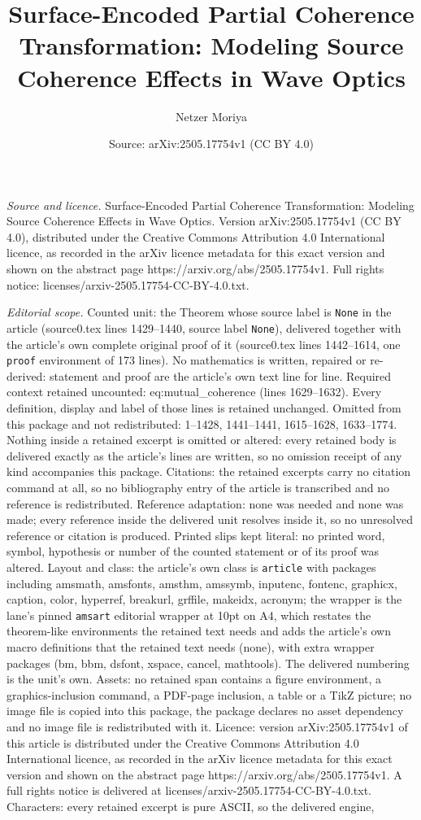 \documentclass[10pt,a4paper]{amsart}
\title[Surface-Encoded Partial Coherence Transformation: Modeling S]{Surface-Encoded Partial Coherence Transformation: Modeling Source Coherence Effects in Wave Optics}
\author{Netzer Moriya}
\date{Source: arXiv:2505.17754v1 (CC BY 4.0)}
\begin{document}
\maketitle

\noindent\emph{Source and licence.} Surface-Encoded Partial Coherence Transformation: Modeling Source Coherence Effects in Wave Optics. Version arXiv:2505.17754v1 (CC BY 4.0), distributed under the Creative Commons Attribution 4.0 International licence, as recorded in the arXiv licence metadata for this exact version and shown on the abstract page https://arxiv.org/abs/2505.17754v1. Full rights notice: licenses/arxiv-2505.17754-CC-BY-4.0.txt.\par\smallskip

\noindent\textit{Editorial scope.} Counted unit: the Theorem whose source label is \texttt{None} in the article (source0.tex lines 1429--1440, source label \texttt{None}), delivered together with the article's own complete original proof of it (source0.tex lines 1442--1614, one \texttt{proof} environment of 173 lines). No mathematics is written, repaired or re-derived: statement and proof are the article's own text line for line. Required context retained uncounted: eq:mutual\_coherence (lines 1629--1632). Every definition, display and label of those lines is retained unchanged. Omitted from this package and not redistributed: 1--1428, 1441--1441, 1615--1628, 1633--1774. Nothing inside a retained excerpt is omitted or altered: every retained body is delivered exactly as the article's lines are written, so no omission receipt of any kind accompanies this package. Citations: the retained excerpts carry no citation command at all, so no bibliography entry of the article is transcribed and no reference is redistributed. Reference adaptation: none was needed and none was made; every reference inside the delivered unit resolves inside it, so no unresolved reference or citation is produced. Printed slips kept literal: no printed word, symbol, hypothesis or number of the counted statement or of its proof was altered. Layout and class: the article's own class is \texttt{article} with packages including amsmath, amsfonts, amsthm, amssymb, inputenc, fontenc, graphicx, caption, color, hyperref, breakurl, grffile, makeidx, acronym; the wrapper is the lane's pinned \texttt{amsart} editorial wrapper at 10pt on A4, which restates the theorem-like environments the retained text needs and adds the article's own macro definitions that the retained text needs (none), with extra wrapper packages (bm, bbm, dsfont, xspace, cancel, mathtools). The delivered numbering is the unit's own. Assets: no retained span contains a figure environment, a graphics-inclusion command, a PDF-page inclusion, a table or a TikZ picture; no image file is copied into this package, the package declares no asset dependency and no image file is redistributed with it. Licence: version arXiv:2505.17754v1 of this article is distributed under the Creative Commons Attribution 4.0 International licence, as recorded in the arXiv licence metadata for this exact version and shown on the abstract page https://arxiv.org/abs/2505.17754v1. A full rights notice is delivered at licenses/arxiv-2505.17754-CC-BY-4.0.txt. Characters: every retained excerpt is pure ASCII, so the delivered engine, 
\end{document}
